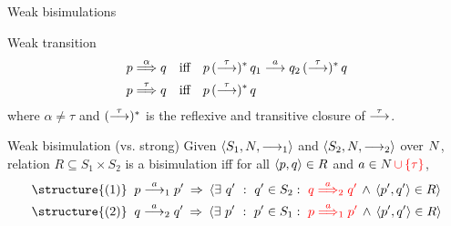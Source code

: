 \documentclass[aspectratio=169]{beamer}
\begin{document}





\begin{slide}{Weak bisimulations}
\small


\begin{block}{Weak transition}
\begin{align*}
  p \stackrel{\alpha}{\Longrightarrow} q ~~~&\text{iff}~~~
  p \,(\stackrel{\tau}{\longrightarrow})^{*}\, q_1\stackrel{a}{\longrightarrow} q_2 \,(\stackrel{\tau}{\longrightarrow})^{*}\, q
  \\
  p \stackrel{\tau}{\Longrightarrow} q ~~~&\text{iff}~~~
  p \,(\stackrel{\tau}{\longrightarrow})^{*}\, q
\end{align*}  
where $\alpha \neq \tau$ and $(\stackrel{\tau}{\longrightarrow})^{*}$ is the reflexive and transitive closure of $\stackrel{\tau}{\longrightarrow}$.
\end{block}

\begin{block}{Weak bisimulation (vs. strong)}
Given  $\mathopen{\langle}S_1, N,  \longrightarrow_1\mathclose{\rangle}$  and $\mathopen{\langle}S_2, N, \longrightarrow_2\mathclose{\rangle}$ over $N$,
relation $R \subseteq S_1 \times S_2$ is a \alert{bisimulation} iff for all $\mathopen{\langle}p,q\mathclose{\rangle} \in R$ and $a \in N\,\textcolor{red}{\cup \left\{ \tau \right\}}$,
%
\begin{align*}
\text{\structure{(1)}}\; \;  & p \rtran{a}_1 p'\; \imp\;
  \rcb{\exists}{q'}{q' \in S_2}{\rdb{q \Trans{a}_2  q'}\, \e\,
  \pair{p',q'} \in R}   \\
\text{\structure{(2)}}\; \;  & q \rtran{a}_2 q'\; \imp\;
  \rcb{\exists}{p'}{p' \in S_1}{\rdb{p \Trans{a}_1 p'}\, \e\,
  \pair{p',q'} \in R}   
\end{align*}
\end{block}
\end{slide}
\end{document}
